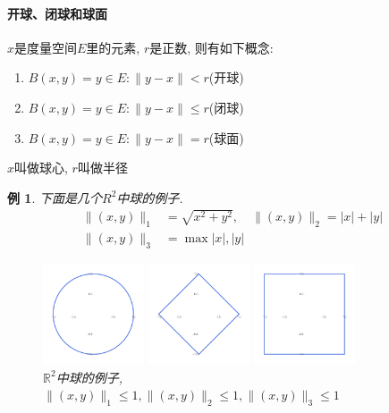 \documentclass[a4paper,11pt]{article}
\theoremstyle{mystyle}
\newtheorem{example}{\hspace{2em}例}[section]
\begin{document}
\paragraph*{开球、闭球和球面}
\begin{definition}
  $x$是度量空间$E$里的元素, $r$是正数, 则有如下概念:
  \begin{enumerate}
    \item $B(x,y)={y\in E:\|y-x\|<r}$(开球)
    \item $B(x,y)={y\in E:\|y-x\|\leq r}$(闭球)
    \item $B(x,y)={y\in E:\|y-x\|=r}$(球面)
  \end{enumerate}
  $x$叫做球心, $r$叫做半径
\end{definition}
\begin{example}
  下面是几个$R^2$中球的例子.
  \begin{equation*}
    \begin{split}
       \|(x,y)\|_1 & =\sqrt{x^2+y^2},\quad\|(x,y)\|_2=|x|+|y| \\
       \|(x,y)\|_3 & =\max{|x|,|y|}
    \end{split}
  \end{equation*}
\begin{figure}[H]
  \centering
  \begin{minipage}{3cm}
    \includegraphics[width=3cm]{fig1.pdf}
  \end{minipage}
  \begin{minipage}{3cm}
    \includegraphics[width=3cm]{fig2.pdf}
  \end{minipage}
  \begin{minipage}{3cm}
    \includegraphics[width=3cm]{fig3.pdf}
  \end{minipage}
  \caption{$\mathbb{R}^2$中球的例子, $\|(x,y)\|_1\leq1, \|(x,y)\|_2\leq1, \|(x,y)\|_3\leq1$}
\end{figure}
\end{example}
\end{document}
